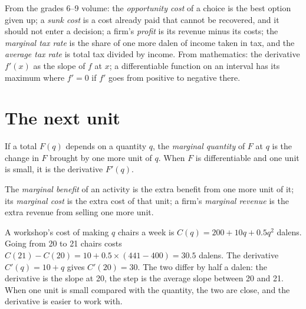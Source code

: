 \begin{recall}
From the grades 6--9 volume: the \emph{opportunity cost} of a choice is the best option given up; a \emph{sunk cost} is a cost already paid that cannot be
recovered, and it should not enter a decision; a firm's \emph{profit} is its revenue minus its costs; the \emph{marginal tax rate} is the share of one more
dalen of income taken in tax, and the \emph{average tax rate} is total tax divided by income. From mathematics: the derivative $f'(x)$ as the slope of $f$ at
$x$; a differentiable function on an interval has its maximum where $f' = 0$ if $f'$ goes from positive to negative there.
\end{recall}

\section{The next unit}\label{sec:g11:marginal-reasoning:next-unit}

\begin{definition}\label{def:g11:marginal-reasoning:marginal-quantity}
If a total $F(q)$ depends on a quantity $q$, the \emph{marginal quantity} of $F$ at $q$ is the change in $F$ brought by one more unit
of $q$. When $F$ is differentiable and one unit is small, it is the derivative $F'(q)$.
\end{definition}

\begin{definition}\label{def:g11:marginal-reasoning:marginal-benefit}
The \emph{marginal benefit} of an activity is the extra benefit from one more unit of it; its \emph{marginal cost}%
\label{def:g11:marginal-reasoning:marginal-cost} is the extra cost of that unit; a firm's \emph{marginal revenue}%
\label{def:g11:marginal-reasoning:marginal-revenue} is the extra revenue from selling one more unit.
\end{definition}

\begin{example}\label{ex:g11:marginal-reasoning:step}
A workshop's cost of making $q$ chairs a week is $C(q) = 200 + 10q + 0.5q^2$ dalens. Going from 20 to 21 chairs costs $C(21) - C(20) = 10 + 0.5 \times (441 - 400)
= 30.5$ dalens. The derivative $C'(q) = 10 + q$ gives $C'(20) = 30$. The two differ by half a dalen: the derivative is the slope at 20, the step is the average
slope between 20 and 21. When one unit is small compared with the quantity, the two are close, and the derivative is easier to work with.
\end{example}

